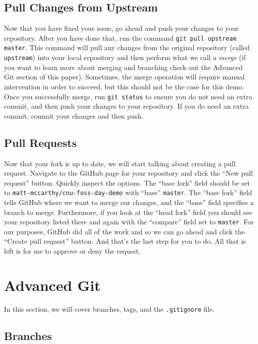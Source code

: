\documentclass[notitlepage]{simple}
\begin{document}
\subsection{Pull Changes from Upstream}

Now that you have fixed your issue, go ahead and push your changes to your repository.
After you have done that, run the command \verb|git pull upstream master|.
This command will pull any changes from the original repository (called \verb|upstream|) into your local repository and then perform what we call a \textit{merge}
(if you want to learn more about merging and branching check out the Advanced Git section of this paper).
Sometimes, the merge operation will require manual intervention in order to succeed, but this should not be the case for this demo.
Once you successfully merge, run \verb|git status| to ensure you do not need an extra commit, and then push your changes to your repository.
If you do need an extra commit, commit your changes and then push.

\subsection{Pull Requests}

Now that your fork is up to date, we will start talking about creating a pull request.
Navigate to the GitHub page for your repository and click the ``New pull request'' button.
Quickly inspect the options.
The ``base fork'' field should be set to \verb|matt-mccarthy/cnu-foss-day-demo| with ``base'' \verb|master|.
The ``base fork'' field tells GitHub where we want to merge our changes, and the ``base'' field specifies a branch to merge.
Furthermore, if you look at the ``head fork'' field you should see your repository listed there and again with the ``compare'' field set to \verb|master|.
For our purposes, GitHub did all of the work and so we can go ahead and click the ``Create pull request'' button.
And that's the last step for you to do.
All that is left is for me to approve or deny the request.

\section{Advanced Git}

In this section, we will cover branches, tags, and the \verb|.gitignore| file.

\subsection{Branches}
\end{document}
